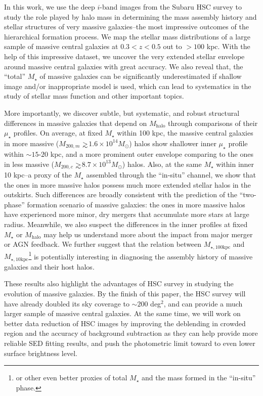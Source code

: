 \documentclass{emulateapj}
\def\gax{{$\mathrel{\hbox{\rlap{\hbox{\lower4pt\hbox{$\sim$}}}\hbox{$>$}}}$}}
\def\mstar{{$M_{\star}$}}
\def\mhalo{{$M_{\mathrm{halo}}$}}
\def\minn{{$M_{\star,10\mathrm{kpc}}$}}
\def\mtot{{$M_{\star,100\mathrm{kpc}}$}}
\def\mden{{$\mu_{\star}$}}
\begin{document}
\begin{CJK*}{UTF8}{gbsn}
    In this work, we use the deep $i$-band images from the Subaru HSC survey to 
    study the role played by halo mass in determining the mass assembly history and 
    stellar structures of very massive galaxies--the most impressive outcomes of 
    the hierarchical formation process.
    We map the stellar mass distributions of a large sample of massive central 
    galaxies at $0.3 < z < 0.5$ out to $>100$ kpc. 
    With the help of this impressive dataset, we uncover the very extended stellar 
    envelope around massive central galaxies with great accuracy. 
    We also reveal that, the ``total'' \mstar{} of massive galaxies can be significantly 
    underestimated if shallow image and/or inappropriate model is used, which can 
    lead to systematics in the study of stellar mass function and other important 
    topics. 
 
    More importantly, we discover subtle, but systematic, and robust structural 
    differences in massive galaxies that depend on \mhalo{} through comparisons
    of their \mden{} profiles. 
    On average, at fixed \mstar{} within 100 kpc, the massive central galaxies in 
    more massive ($M_{200,m}$ \gax $1.6\times 10^{14} M_{\odot}$) halos show shallower 
    inner \mden{} profile within $\sim 15$-$20$ kpc, and a more prominent outer 
    envelope comparing to the ones in less massive 
    ($M_{200,c}$ \gax $8.7\times 10^{13} M_{\odot}$) halos.
    Also, at the same \mstar{} within inner 10 kpc--a proxy of the \mstar{} assembled 
    through the ``in-situ'' channel, we show that the ones in more massive halos 
    possess much more extended stellar halos in the outskirts.  
    Such differences are broadly consistent with the prediction of the ``two-phase''
    formation scenario of massive galaxies: the ones in more massive halos have 
    experienced more minor, dry mergers that accumulate more stars at large radius. 
    Meanwhile, we also suspect the differences in the inner profiles at fixed \mstar{} 
    or \mhalo{} may help us understand more about the impact from major merger or 
    AGN feedback. 
    We further suggest that the relation between \mtot{} and \minn{}\footnote{or other 
    even better proxies of total \mstar{} and the mass formed in the ``in-situ'' phase.} 
    is potentially interesting in diagnosing the assembly history of massive galaxies 
    and their host halos. 

    These results also highlight the advantages of HSC survey in studying the evolution 
    of massive galaxies.
    By the finish of this paper, the HSC survey will have already doubled its sky 
    coverage to $\sim 200$ deg$^2$, and can provide a much larger sample of massive 
    central galaxies. 
    At the same time, we will work on better data reduction of HSC images by 
    improving the deblending in crowded region and the accuracy of background 
    subtraction as they can help provide more reliable SED fitting results, and 
    push the photometric limit toward to even lower surface brightness level.  
    

\end{CJK*}
\end{document}
